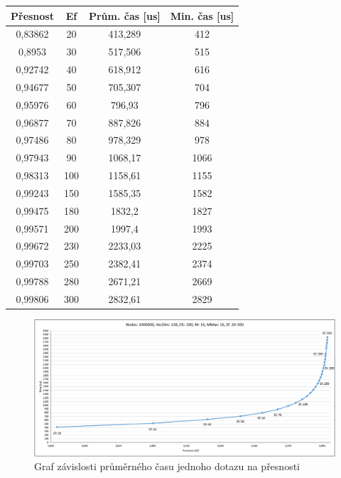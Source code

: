 \documentclass[czech,semestral,dept460,male,csharp,cpdeclaration]{diploma}
\begin{document}
		\begin{center}
			\begin{tabular}{c c c c}\label{HNSWM}
				
				Přesnost & Ef & Prům. čas [us] & Min. čas [us] \\
				\midrule
				0,83862 & 20 & 413,289 & 412 \\
				0,8953 & 30 & 517,506 & 515 \\
				0,92742 & 40 & 618,912 & 616 \\
				0,94677 & 50 & 705,307 & 704 \\
				0,95976 & 60 & 796,93 & 796 \\
				0,96877 & 70 & 887,826 & 884 \\
				0,97486 & 80 & 978,329 & 978 \\
				0,97943 & 90 & 1068,17 & 1066 \\
				0,98313 & 100 & 1158,61 & 1155 \\
				0,99243 & 150 & 1585,35 & 1582 \\
				0,99475 & 180 & 1832,2 & 1827 \\
				0,99571 & 200 & 1997,4 & 1993 \\
				0,99672 & 230 & 2233,03 & 2225 \\
				0,99703 & 250 & 2382,41 & 2374 \\
				0,99788 & 280 & 2671,21 & 2669 \\
				0,99806 & 300 & 2832,61 & 2829 \\

			\end{tabular}
		
		\end{center}
		
		\begin{figure}
			\centering
			\includegraphics[scale=0.5]{Figures/graf_hnsw.png}
			\caption{Graf závislosti průměrného času jednoho dotazu na přesnosti}
			\label{graf_hnsw}
		\end{figure}
	
\end{document}
